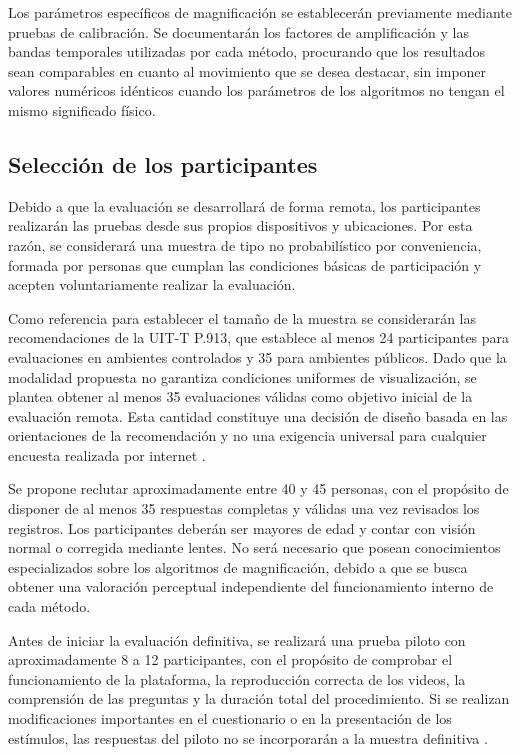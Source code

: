 Los parámetros específicos de magnificación se establecerán previamente mediante pruebas de calibración. Se documentarán los factores de amplificación y las bandas temporales utilizadas por cada método, procurando que los resultados sean comparables en cuanto al movimiento que se desea destacar, sin imponer valores numéricos idénticos cuando los parámetros de los algoritmos no tengan el mismo significado físico.

\subsection{Selección de los participantes}

Debido a que la evaluación se desarrollará de forma remota, los participantes realizarán las pruebas desde sus propios dispositivos y ubicaciones. Por esta razón, se considerará una muestra de tipo no probabilístico por conveniencia, formada por personas que cumplan las condiciones básicas de participación y acepten voluntariamente realizar la evaluación.

Como referencia para establecer el tamaño de la muestra se considerarán las recomendaciones de la UIT-T P.913, que establece al menos 24 participantes para evaluaciones en ambientes controlados y 35 para ambientes públicos. Dado que la modalidad propuesta no garantiza condiciones uniformes de visualización, se plantea obtener al menos 35 evaluaciones válidas como objetivo inicial de la evaluación remota. Esta cantidad constituye una decisión de diseño basada en las orientaciones de la recomendación y no una exigencia universal para cualquier encuesta realizada por internet \cite{P9132021}.

Se propone reclutar aproximadamente entre 40 y 45 personas, con el propósito de disponer de al menos 35 respuestas completas y válidas una vez revisados los registros. Los participantes deberán ser mayores de edad y contar con visión normal o corregida mediante lentes. No será necesario que posean conocimientos especializados sobre los algoritmos de magnificación, debido a que se busca obtener una valoración perceptual independiente del funcionamiento interno de cada método.

Antes de iniciar la evaluación definitiva, se realizará una prueba piloto con aproximadamente 8 a 12 participantes, con el propósito de comprobar el funcionamiento de la plataforma, la reproducción correcta de los videos, la comprensión de las preguntas y la duración total del procedimiento. Si se realizan modificaciones importantes en el cuestionario o en la presentación de los estímulos, las respuestas del piloto no se incorporarán a la muestra definitiva \cite{P9132021}.

